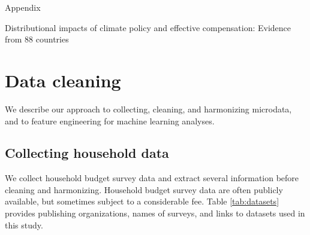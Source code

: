 \documentclass[12pt, a4paper]{article}
\begin{document}
\appendix 
\begin{refsection}
{\Huge Appendix} \label{sec:appendix}

Distributional impacts of climate policy and effective compensation: Evidence from 88 countries

\clearpage
\section{Data cleaning} \label{sec:cleaning}

We describe our approach to collecting, cleaning, and harmonizing microdata, and to feature engineering for machine learning analyses.

\subsection{Collecting household data}\label{sec:cleaning_1}

We collect household budget survey data and extract several information before cleaning and harmonizing. Household budget survey data are often publicly available, but sometimes subject to a considerable fee. Table \ref{tab:datasets} provides publishing organizations, names of surveys, and links to datasets used in this study.


\end{refsection}
\end{document}
